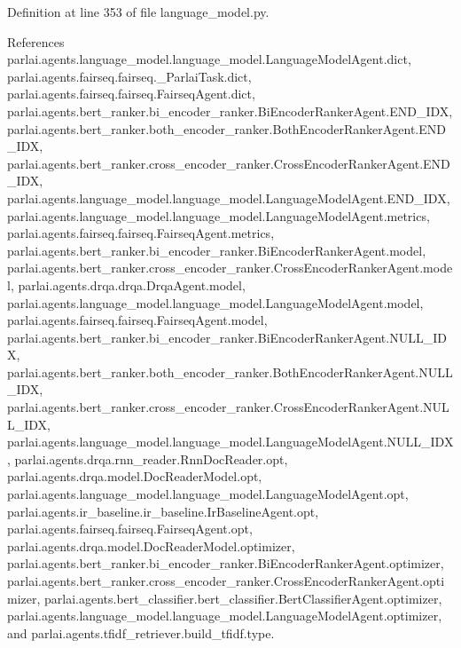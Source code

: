 Definition at line 353 of file language\+\_\+model.\+py.



References parlai.\+agents.\+language\+\_\+model.\+language\+\_\+model.\+Language\+Model\+Agent.\+dict, parlai.\+agents.\+fairseq.\+fairseq.\+\_\+\+Parlai\+Task.\+dict, parlai.\+agents.\+fairseq.\+fairseq.\+Fairseq\+Agent.\+dict, parlai.\+agents.\+bert\+\_\+ranker.\+bi\+\_\+encoder\+\_\+ranker.\+Bi\+Encoder\+Ranker\+Agent.\+E\+N\+D\+\_\+\+I\+DX, parlai.\+agents.\+bert\+\_\+ranker.\+both\+\_\+encoder\+\_\+ranker.\+Both\+Encoder\+Ranker\+Agent.\+E\+N\+D\+\_\+\+I\+DX, parlai.\+agents.\+bert\+\_\+ranker.\+cross\+\_\+encoder\+\_\+ranker.\+Cross\+Encoder\+Ranker\+Agent.\+E\+N\+D\+\_\+\+I\+DX, parlai.\+agents.\+language\+\_\+model.\+language\+\_\+model.\+Language\+Model\+Agent.\+E\+N\+D\+\_\+\+I\+DX, parlai.\+agents.\+language\+\_\+model.\+language\+\_\+model.\+Language\+Model\+Agent.\+metrics, parlai.\+agents.\+fairseq.\+fairseq.\+Fairseq\+Agent.\+metrics, parlai.\+agents.\+bert\+\_\+ranker.\+bi\+\_\+encoder\+\_\+ranker.\+Bi\+Encoder\+Ranker\+Agent.\+model, parlai.\+agents.\+bert\+\_\+ranker.\+cross\+\_\+encoder\+\_\+ranker.\+Cross\+Encoder\+Ranker\+Agent.\+model, parlai.\+agents.\+drqa.\+drqa.\+Drqa\+Agent.\+model, parlai.\+agents.\+language\+\_\+model.\+language\+\_\+model.\+Language\+Model\+Agent.\+model, parlai.\+agents.\+fairseq.\+fairseq.\+Fairseq\+Agent.\+model, parlai.\+agents.\+bert\+\_\+ranker.\+bi\+\_\+encoder\+\_\+ranker.\+Bi\+Encoder\+Ranker\+Agent.\+N\+U\+L\+L\+\_\+\+I\+DX, parlai.\+agents.\+bert\+\_\+ranker.\+both\+\_\+encoder\+\_\+ranker.\+Both\+Encoder\+Ranker\+Agent.\+N\+U\+L\+L\+\_\+\+I\+DX, parlai.\+agents.\+bert\+\_\+ranker.\+cross\+\_\+encoder\+\_\+ranker.\+Cross\+Encoder\+Ranker\+Agent.\+N\+U\+L\+L\+\_\+\+I\+DX, parlai.\+agents.\+language\+\_\+model.\+language\+\_\+model.\+Language\+Model\+Agent.\+N\+U\+L\+L\+\_\+\+I\+DX, parlai.\+agents.\+drqa.\+rnn\+\_\+reader.\+Rnn\+Doc\+Reader.\+opt, parlai.\+agents.\+drqa.\+model.\+Doc\+Reader\+Model.\+opt, parlai.\+agents.\+language\+\_\+model.\+language\+\_\+model.\+Language\+Model\+Agent.\+opt, parlai.\+agents.\+ir\+\_\+baseline.\+ir\+\_\+baseline.\+Ir\+Baseline\+Agent.\+opt, parlai.\+agents.\+fairseq.\+fairseq.\+Fairseq\+Agent.\+opt, parlai.\+agents.\+drqa.\+model.\+Doc\+Reader\+Model.\+optimizer, parlai.\+agents.\+bert\+\_\+ranker.\+bi\+\_\+encoder\+\_\+ranker.\+Bi\+Encoder\+Ranker\+Agent.\+optimizer, parlai.\+agents.\+bert\+\_\+ranker.\+cross\+\_\+encoder\+\_\+ranker.\+Cross\+Encoder\+Ranker\+Agent.\+optimizer, parlai.\+agents.\+bert\+\_\+classifier.\+bert\+\_\+classifier.\+Bert\+Classifier\+Agent.\+optimizer, parlai.\+agents.\+language\+\_\+model.\+language\+\_\+model.\+Language\+Model\+Agent.\+optimizer, and parlai.\+agents.\+tfidf\+\_\+retriever.\+build\+\_\+tfidf.\+type.

